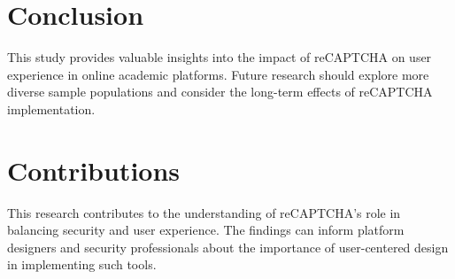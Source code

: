\documentclass{article}
\begin{document}
\section{Conclusion}
This study provides valuable insights into the impact of reCAPTCHA on user experience in online academic platforms. Future research should explore more diverse sample populations and consider the long-term effects of reCAPTCHA implementation.

\section{Contributions}
This research contributes to the understanding of reCAPTCHA's role in balancing security and user experience. The findings can inform platform designers and security professionals about the importance of user-centered design in implementing such tools.



\end{document}
